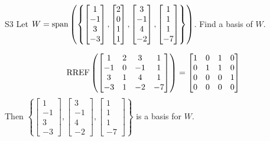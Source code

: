 \documentclass{sbgLAquiz}
\begin{document}
\begin{problem}{S3}  
Let $W={\rm span}\left( \left\{ \begin{bmatrix} 1 \\ -1 \\ 3 \\ -3 \end{bmatrix},\begin{bmatrix} 2 \\ 0 \\ 1 \\ 1 \end{bmatrix}, \begin{bmatrix} 3 \\ -1 \\ 4 \\ -2 \end{bmatrix},  \begin{bmatrix} 1 \\ 1 \\ 1 \\ -7 \end{bmatrix} \right\}\right)$.  Find a basis of $W$.
\end{problem}
\begin{solution}
$$ \operatorname{RREF} \left( \begin{bmatrix} 1 & 2 & 3 & 1 \\ -1 & 0 & -1 & 1 \\ 3 & 1 & 4 & 1 \\ -3 & 1 & -2 & -7 \end{bmatrix} \right) =  \begin{bmatrix} 1 & 0 & 1 & 0 \\ 0 & 1 & 1 & 0 \\ 0 & 0 & 0 & 1 \\ 0 & 0 & 0 & 0\end{bmatrix}$$
Then  $\left\{ \begin{bmatrix} 1 \\ -1 \\ 3 \\ -3 \end{bmatrix}, \begin{bmatrix} 3 \\ -1 \\ 4 \\ -2 \end{bmatrix},  \begin{bmatrix} 1 \\ 1 \\ 1 \\ -7 \end{bmatrix} \right\}$ is a basis for $W$.
\end{solution}
\end{document}

